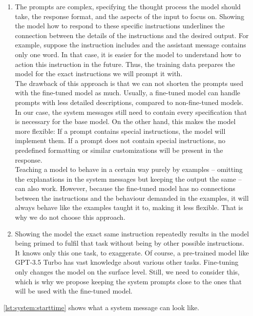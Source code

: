 \begin{enumerate}
    \item
        The prompts are complex, specifying the thought process the model should take, the response format, and the aspects of the input to focus on. Showing the model how to respond to these specific instructions underlines the connection between the details of the instructions and the desired output. For example, suppose the instruction includes  and the assistant message contains only one word. In that case, it is easier for the model to understand how to action this instruction in the future. Thus, the training data prepares the model for the exact instructions we will prompt it with.\\
        The drawback of this approach is that we can not shorten the prompts used with the fine-tuned model as much. Usually, a fine-tuned model can handle prompts with less detailed descriptions, compared to non-fine-tuned models. In our case, the system messages still need to contain every specification that is necessary for the base model. On the other hand, this makes the model more flexible: If a prompt contains special instructions, the model will implement them. If a prompt does not contain special instructions, no predefined formatting or similar customizations will be present in the response.\\
        Teaching a model to behave in a certain way purely by examples – omitting the explanations in the system messages but keeping the output the same – can also work. However, because the fine-tuned model has no connections between the instructions and the behaviour demanded in the examples, it will always behave like the examples taught it to, making it less flexible. That is why we do not choose this approach.
    \item 
        Showing the model the exact same instruction repeatedly results in the model being primed to fulfil that task without being  by other possible instructions. It knows only this one task, to exaggerate. Of course, a pre-trained model like GPT-3.5 Turbo has vast knowledge about various other tasks. Fine-tuning only changes the model on the surface level. Still, we need to consider this, which is why we propose keeping the system prompts close to the ones that will be used with the fine-tuned model.
\end{enumerate}
\autoref{lst:system:starttime} shows what a system message can look like.

